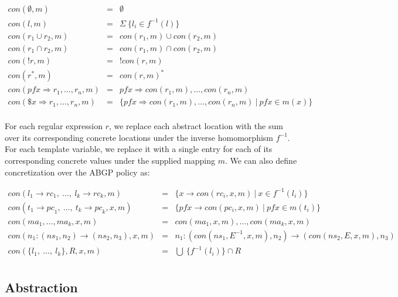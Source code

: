 \documentclass[twocolumn]{sig-alternate-10pt}
\begin{document}
\[ \begin{array}{rcl}
  con(\emptyset,m)                        & = & \emptyset \\
  con(l,m)                                & = & \Sigma ~ \{ l_i \in f^{-1}(l) \} \\
  con(r_1 \cup r_2,m)                     & = & con(r_1,m) \cup con(r_2,m) \\
  con(r_1 \cap r_2,m)                     & = & con(r_1,m) \cap con(r_2,m) \\
  con(!r,m)                               & = & !con(r,m) \\
  con(r^*,m)                              & = & con(r,m)^* \\
  con(pfx \Rightarrow r_1, \dots, r_n,m)  & = & pfx \Rightarrow con(r_1,m), \dots, con(r_n,m) \\
  con(\$x \Rightarrow r_1, \dots, r_n,m)  & = & \{ pfx \Rightarrow con(r_1,m), \dots, con(r_n,m) ~\vert~ {pfx} \in m(x) \} \\
\end{array} \]

For each regular expression $r$, we replace each abstract location with the sum over its corresponding concrete locations under the inverse homomorphism $f^{-1}$. For each template variable, we replace it with a single entry for each of its corresponding concrete values under the supplied mapping $m$.
We can also define concretization over the ABGP policy as:

\[ \begin{array}{rcl}
     con(l_1 \rightarrow {rc}_1, ~\dots,~ l_k \rightarrow {rc}_k,m) 
        & = & 
        \{ x \rightarrow con(rc_i,x,m)  ~\vert~ x \in f^{-1}(l_i) \}
        \\
     con(t_1 \rightarrow {pc}_1, ~\dots,~ t_k \rightarrow {pc}_k,x,m) 
        & = &  
        \{ pfx \rightarrow con(pc_i,x,m) ~\vert~ pfx \in m(t_i) \}
        \\
     con(ma_1, \dots, ma_k,x,m) 
        & = &
        con(ma_1,x,m), \dots, con(ma_k,x,m)
        \\
     con(n_1 : ({ns}_1, n_2) \rightarrow ({ns}_2, n_3),x,m) 
        & = & 
        n_1 : ( con({ns}_1,E^{-1},x,m), n_2) \rightarrow (con({ns}_2,E,x,m),n_3)
        \\
     con(\{ l_1, ~\dots,~ l_k \}, R, x, m) 
        & = &  
        \bigcup ~ \{ f^{-1}(l_i) \} \cap R
        \\
\end{array} \]

\subsection{Abstraction}
\end{document}
